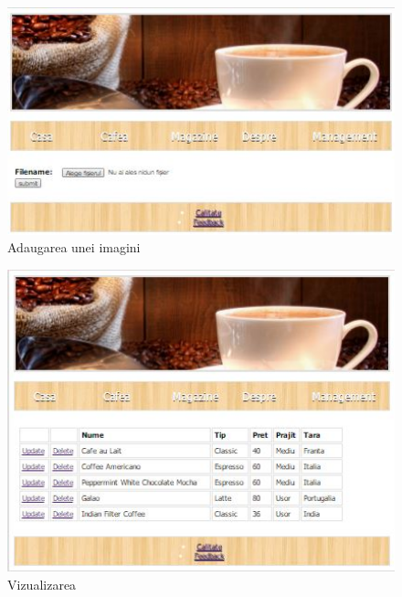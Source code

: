 \begin{figure}[!ht]
	
	\centering
	
	\includegraphics[width=1.0\textwidth]{Cattura6.JPG}
	
	\caption{Adaugarea unei imagini}
	
	\label{Im_label}
	
\end{figure}

\begin{figure}[!ht]
	
	\centering
	
	\includegraphics[width=1.0\textwidth]{Cattura7.JPG}
	
	\caption{Vizualizarea}
	
	\label{Im_label}
	
\end{figure}

